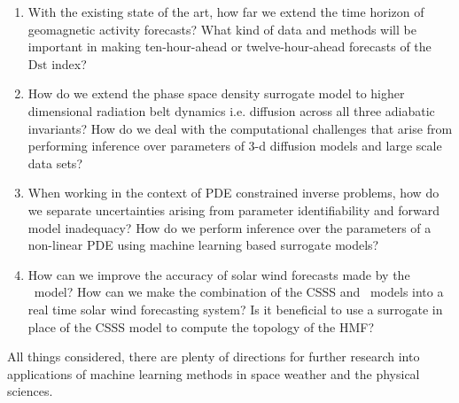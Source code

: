 \begin{enumerate}
    \item With the existing state of the art, how far we extend the time horizon of geomagnetic 
          activity forecasts? What kind of data and methods will be important in making 
          ten-hour-ahead or twelve-hour-ahead forecasts of the $\mathrm{Dst}$ index?
    \item How do we extend the phase space density surrogate model to higher dimensional 
          radiation belt dynamics i.e. diffusion across all three adiabatic invariants?
          How do we deal with the computational challenges that arise from performing inference 
          over parameters of $3$-d diffusion models and large scale data sets? 
    \item When working in the context of PDE constrained inverse problems, how do we separate 
          uncertainties arising from parameter identifiability and forward model inadequacy? How do 
          we perform inference over the parameters of a non-linear PDE using machine learning based 
          surrogate models?
    \item How can we improve the accuracy of solar wind forecasts made by the \XX \ model? How can 
          we make the combination of the CSSS and \XX \ models into a real time solar wind 
          forecasting system? Is it beneficial to use a surrogate in place of the CSSS model to 
          compute the topology of the HMF? 
\end{enumerate}

All things considered, there are plenty of directions for further research into applications of 
machine learning methods in space weather and the physical sciences.
